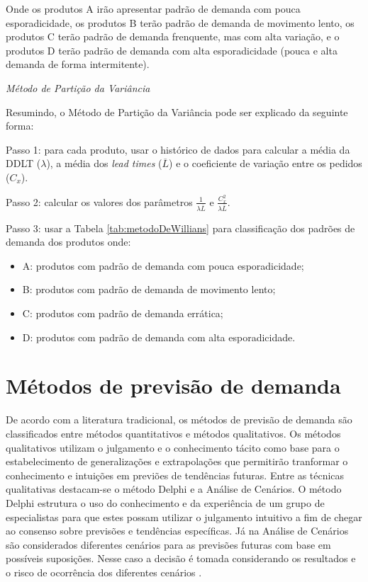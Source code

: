 \documentclass{book}
\begin{document}
Onde os produtos A irão apresentar padrão de demanda com pouca esporadicidade, os produtos B terão padrão de demanda de movimento lento, os produtos C terão padrão de demanda frenquente, mas com alta variação, e o produtos D terão padrão de demanda com alta esporadicidade (pouca e alta demanda de forma intermitente).

\emph{Método de Partição da Variância}

Resumindo, o Método de Partição da Variância pode ser explicado da seguinte forma:

Passo 1: para cada produto, usar o histórico de dados para calcular a média da DDLT ($\lambda$), a média dos \emph{lead times} ($\overline{L}$) e o coeficiente de variação entre os pedidos ($C_x$).

Passo 2: calcular os valores dos parâmetros $\frac{1}{\lambda \overline{L}}$ e $\frac{C_x^2}{\lambda \overline{L}}$.

Passo 3: usar a Tabela \ref{tab:metodoDeWillians} para classificação dos padrões de demanda dos produtos onde:

\begin{itemize}
\item A: produtos com padrão de demanda com pouca esporadicidade;
\item B: produtos com padrão de demanda de movimento lento;
\item C: produtos com padrão de demanda errática;
\item D: produtos com padrão de demanda com alta esporadicidade.
\end{itemize}

\chapter{Métodos de previsão de demanda}
\label{metodosDePrevisão}

De acordo com a literatura tradicional, os métodos de previsão de demanda são classificados entre métodos quantitativos e métodos qualitativos. Os métodos qualitativos utilizam o julgamento e o conhecimento tácito como base para o estabelecimento de generalizações e extrapolações que permitirão tranformar o conhecimento e intuições em previões de tendências futuras. Entre as técnicas qualitativas destacam-se o método Delphi e a Análise de Cenários. O método Delphi estrutura o uso do conhecimento e da experiência de um grupo de especialistas para que estes possam utilizar o julgamento intuitivo a fim de chegar ao consenso sobre previsões e tendências específicas. Já na Análise de Cenários são considerados diferentes cenários para as previsões futuras com base em possíveis suposições. Nesse caso a decisão é tomada considerando os resultados e o risco de ocorrência dos diferentes cenários \citep{WankeJulianelli2006}.
\end{document}
